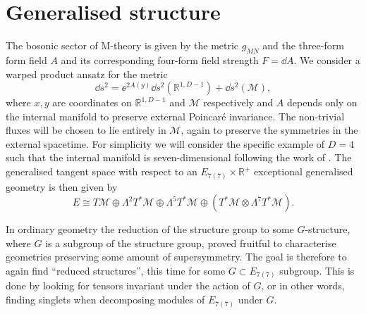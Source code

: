 \section{Generalised structure\label{sec:GeneralisedStructures}}
The bosonic sector of M-theory is given by the metric $g_{MN}$ and the three-form form field $A$ and its corresponding four-form field strength $F=\dd A$. We consider a warped product ansatz for the metric 
\begin{equation}
    \dd s^2 = \ee^{2A(y)}\dd s^2(\mathbb{R}^{1,D-1})+\dd s^2(\mathcal{M}),
\end{equation}
where $x,y$ are coordinates on $\mathbb{R}^{1,D-1}$ and $\mathcal{M}$ respectively and $A$ depends only on the internal manifold to preserve external Poincaré invariance. The non-trivial fluxes will be chosen to lie entirely in $\mathcal{M}$, again to preserve the symmetries in the external spacetime. For simplicity we will consider the specific example of $D=4$ such that the internal manifold is seven-dimensional following the work of \cite{Ashmore:2015joa}. The generalised tangent space with respect to an $E_{7(7)}\times\mathbb{R}^+$ exceptional generalised geometry is then given by 
\begin{equation}
    E \cong T\mathcal{M}\oplus\Lambda^2T^*\mathcal{M}\oplus\Lambda^5T^*\mathcal{M}\oplus\left(T^*\mathcal{M}\otimes\Lambda^7 T^*\mathcal{M}\right).
\end{equation}

\begin{comment}
Moreover, given $E$ we can construct the generalized frame bundle $F$ given by frames $\{E_A\}$, where $A=1,2,\ldots 56$. Explicitly, in a patch $U$ there exists a canonical basis given by 
\begin{equation}
    \{E_A\} = \{\pd/\pd y^m\}\cup \{\dd y^{m_1}\wedge\dd y^{m_2}\}\cup\{\dd y^{m_1}\wedge\ldots\wedge\dd y^{m_5}\}\cup \{\dd y^m\otimes\dd y^{m_1}\wedge\ldots\wedge\dd y^{m_7}\},
\end{equation}
and any other frame is related to such a frame by an $E_{7(7)}\times \mathbb{R}^+$ transformation, this then defines a principle bundle $F$ with structure group $E_{7(7)}\times \mathbb{R}^+$. Any other tensor field can then be constructed as sections of an associated vector bundle, thus making the exceptional group manifest in the formulation. 
\end{comment}

In ordinary geometry the reduction of the structure group to some $G$-structure, where $G$ is a subgroup of the structure group, proved fruitful to characterise geometries preserving some amount of supersymmetry. The goal is therefore to again find ``reduced structures'', this time for some $G\subset E_{7(7)}$ subgroup. This is done by looking for tensors invariant under the action of $G$, or in other words, finding singlets when decomposing modules of $E_{7(7)}$ under $G$. 

